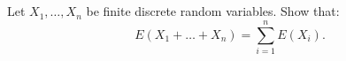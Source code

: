 \documentclass[12pt]{article}
\begin{document}
\begin{correctionbox}

\end{correctionbox}

\section{}
Let \( X_1, \dots, X_n \) be finite discrete random variables. Show that:
\[
E(X_1 + \dots + X_n) = \sum_{i=1}^n E(X_i).
\]

\begin{correctionbox}

\end{correctionbox}
\end{document}
